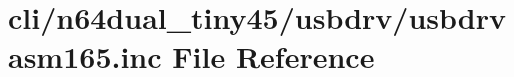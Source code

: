 \hypertarget{usbdrvasm165_8inc}{\section{cli/n64dual\-\_\-tiny45/usbdrv/usbdrvasm165.inc File Reference}
\label{usbdrvasm165_8inc}
}
